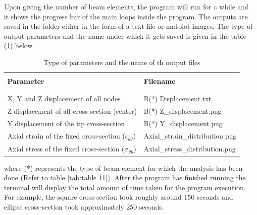 \documentclass[a4paper,12pt]{article}
\begin{document}
Upon giving the number of beam elements, the program will run for a while and it shows the progress bar of the main loops inside the program. The outputs are saved in the folder either in the form of a text file or matplot images. The type of output parameters and the name under which it gets saved is given in the table (\ref{tab:table 12}) below

\begin{table}[h!]
  \begin{center}
     \begin{tabular}{l  l}
      \hline\\
      \textbf{Parameter} & \textbf{Filename} \\
      \\
      \hline
      \\[-2pt]
       
       X, Y and Z displacement of all nodes               & B(*) Displacement.txt\\[5pt]
       Z displacement of all cross-section (center)       & B(*) Z\_displacement.png\\[5pt]
       Y displacement of the tip cross-section            & B(*) Y\_displacement.png\\[5pt]
       Axial strain of the fixed cross-section ($\epsilon_{yy}$)            & Axial\_strain\_distribution.png\\[5pt]
       Axial stress of the fixed cross-section ($\sigma_{yy}$)           & Axial\_stress\_distribution.png\\[5pt]      
      
      \hline
     \end{tabular}
    \caption{Type of parameters and the name of th output files}
    \label{tab:table 12}
  \end{center}
\end{table}

where (*) represents the type of beam element for which the analysis has been done (Refer to  table \ref{tab:table 11}). After the program has finished running the terminal will display the total amount of time taken for the program execution. For example, the square cross-section took roughly around 150 seconds and ellipse cross-section took approximately 250 seconds.
\end{document}
